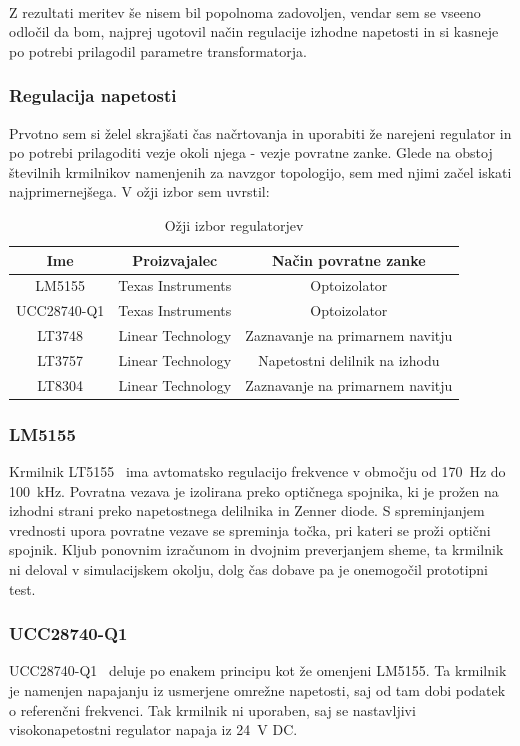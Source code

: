 \documentclass[a4paper,twoside,openright,12pt,Slovene]{book}
\begin{document}
~\\Z rezultati meritev še nisem bil popolnoma zadovoljen, vendar sem se vseeno odločil da bom, najprej ugotovil način regulacije izhodne napetosti in si kasneje po potrebi prilagodil parametre transformatorja. 

	\subsubsection{Regulacija napetosti} \label{RegulacijaNapetosti}
	Prvotno sem si želel skrajšati čas načrtovanja in uporabiti že narejeni regulator in po potrebi prilagoditi vezje okoli njega - vezje povratne zanke. Glede na obstoj številnih krmilnikov namenjenih za navzgor topologijo, sem med njimi začel iskati najprimernejšega. V ožji izbor sem uvrstil:
	
\begin{table}[h!]
\centering
\begin{tabular}{||c | c |c||}
\hline
Ime & Proizvajalec & Način povratne zanke \\[0.5ex]
\hline\hline
LM5155 & Texas Instruments & Optoizolator \\
UCC28740-Q1 & Texas Instruments & Optoizolator \\
LT3748 & Linear Technology & Zaznavanje na primarnem navitju \\
LT3757 & Linear Technology & Napetostni delilnik na izhodu \\
LT8304 & Linear Technology & Zaznavanje na primarnem navitju \\ [1ex]

\hline
\end{tabular}
\caption{Ožji izbor regulatorjev}
\end{table}

	\subsubsection{LM5155} \label{LM5155}
Krmilnik LT5155~\cite{TI:LT5155} ima avtomatsko regulacijo frekvence v območju od \SI{170}{\hertz} do \SI{100}{\kilo\hertz}. Povratna vezava je izolirana preko optičnega spojnika, ki je prožen na izhodni strani preko napetostnega delilnika in Zenner diode. S spreminjanjem vrednosti upora povratne vezave se spreminja točka, pri kateri se proži optični spojnik. Kljub ponovnim izračunom in dvojnim preverjanjem sheme, ta krmilnik ni deloval v simulacijskem okolju, dolg čas dobave pa je onemogočil prototipni test.


	\subsubsection{UCC28740-Q1} \label{UCC28740-Q1}
UCC28740-Q1~\cite{TI:UCC28740} deluje po enakem principu kot že omenjeni LM5155. Ta krmilnik je namenjen napajanju iz usmerjene omrežne napetosti, saj od tam dobi podatek o referenčni frekvenci. Tak krmilnik ni uporaben, saj se nastavljivi visokonapetostni regulator napaja iz \SI{24}{\volt} DC.
\end{document}
